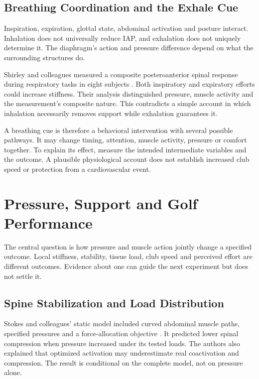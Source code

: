 \subsection{Breathing Coordination and the Exhale Cue}

Inspiration, expiration, glottal state, abdominal activation and posture interact. Inhalation does not universally reduce IAP, and exhalation does not uniquely determine it. The diaphragm's action and pressure difference depend on what the surrounding structures do.

Shirley and colleagues measured a composite posteroanterior spinal response during respiratory tasks in eight subjects \citep{Shirley2003Respiration}. Both inspiratory and expiratory efforts could increase stiffness. Their analysis distinguished pressure, muscle activity and the measurement's composite nature. This contradicts a simple account in which inhalation necessarily removes support while exhalation guarantees it.

A breathing cue is therefore a behavioral intervention with several possible pathways. It may change timing, attention, muscle activity, pressure or comfort together. To explain its effect, measure the intended intermediate variables and the outcome. A plausible physiological account does not establish increased club speed or protection from a cardiovascular event.

\section{Pressure, Support and Golf Performance}
\label{sec:iap_helps}

The central question is how pressure and muscle action jointly change a specified outcome. Local stiffness, stability, tissue load, club speed and perceived effort are different outcomes. Evidence about one can guide the next experiment but does not settle it.

\subsection{Spine Stabilization and Load Distribution}

Stokes and colleagues' static model included curved abdominal muscle paths, specified pressures and a force-allocation objective \citep{Stokes2010AbdominalPressure}. It predicted lower spinal compression when pressure increased under its tested loads. The authors also explained that optimized activation may underestimate real coactivation and compression. The result is conditional on the complete model, not on pressure alone.


